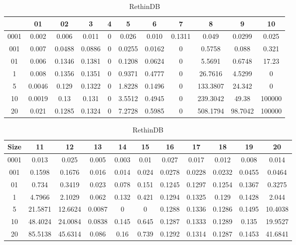 \begin{center}
\begin{table} [ht]
\tiny
\caption{RethinDB}
\label{rethink-query-result-table}
\begin{tabular}{|c|c|c|c|c|c|c|c|c|c|c| } 
    &  01 & 02 & 3 & 4 & 5 & 6 & 7 & 8 & 9 & 10 \\
 \hline
0001 & 0.002 & 0.006 & 0.011 & 0 & 0.026 & 0.010 & 0.1311 & 0.049 & 0.0299 & 0.025	\\
001 & 0.007 & 0.0488 & 0.0886 & 0 & 0.0255 & 0.0162 & 0 & 0.5758 & 0.088 & 0.321	\\
01 & 0.006 & 0.1346 & 0.1381 & 0 & 0.1208 & 0.0624 & 0 & 5.5691 & 0.6748 & 17.23	\\
1 & 0.008 & 0.1356 & 0.1351 & 0 & 0.9371 & 0.4777 & 0 & 26.7616 & 4.5299 & 0\\
5 & 0.0046 & 0.129 & 0.1322 & 0 & 1.8228 & 0.1496 & 0 & 133.3807 & 24.342 & 0	\\
10 & 0.0019 & 0.13 & 0.131 & 0 & 3.5512 & 0.4945 & 0 & 239.3042 & 49.38 & 100000	\\
20 & 0.021 & 0.1285 & 0.1324 & 0 & 7.2728 & 0.5985 & 0 & 508.1794 & 98.7042 & 100000	\\

\end{tabular}
\begin{tabular}{|c|c|c|c|c|c|c|c|c|c|c| } 
Size & 11 & 12 & 13 & 14 & 15 & 16 & 17 & 18 & 19 & 20	\\
\hline
0001 & 0.013 & 0.025 & 0.005 & 0.003 & 0.01 & 0.027 & 0.017 & 0.012 & 0.008 & 0.014	\\
001 & 0.1598 & 0.1676 & 0.016 & 0.014 & 0.024 & 0.0278 & 0.0228 & 0.0232 & 0.0455 & 0.0464	\\
01 & 0.734 & 0.3419 & 0.023 & 0.078 & 0.151 & 0.1245 & 0.1297 & 0.1254 & 0.1367 & 0.3275	\\
1 & 4.7966 & 2.1029 & 0.062 & 0.132 & 0.421 & 0.1294 & 0.1325 & 0.129 & 0.1428 & 2.044	\\
5 & 21.5871 & 12.6624 & 0.0087 & 0 & 0 & 0.1288 & 0.1336 & 0.1286 & 0.1495 & 10.4038	\\
10 & 48.4024 & 24.0084 & 0.0838 & 0.145 & 0.645 & 0.1287 & 0.1333 & 0.1289 & 0.135 & 19.9527	\\
20 & 85.5138 & 45.6314 & 0.086 & 0.16 & 0.739 & 0.1292 & 0.1314 & 0.1287 & 0.1453 & 41.6841	\\

\end{tabular}
\end{table}



\end{center}
